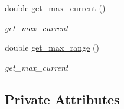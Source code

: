 \begin{DoxyCompactItemize}
double \hyperlink{classblmc__robots_1_1TestBench8Motors_abd3b8a40787ad9e6c019b849da9ca07c}{get\+\_\+max\+\_\+current} ()
\begin{DoxyCompactList}\small\item\em get\+\_\+max\+\_\+current \end{DoxyCompactList}\item 
double \hyperlink{classblmc__robots_1_1TestBench8Motors_a17ac05712b3cb4e63dfd8cdb80b16eea}{get\+\_\+max\+\_\+range} ()
\begin{DoxyCompactList}\small\item\em get\+\_\+max\+\_\+current \end{DoxyCompactList}\end{DoxyCompactItemize}
\subsection*{Private Attributes}
